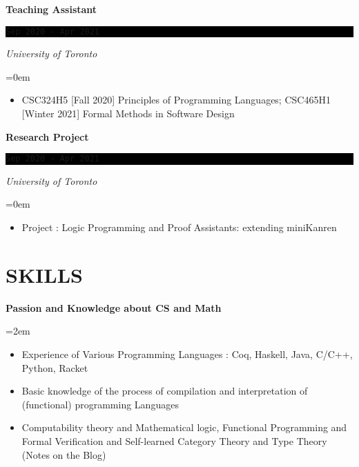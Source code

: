 \documentclass[fontsize=11pt]{article}
\newcommand{\NewPart}[1]{\section*{\uppercase{#1}}}
\newcommand{\SkillEntry}[2]{       %
    \noindent \textbf{#1} \hfill      %
        \noindent \textit{#2} \par        %
}
\newcommand{\SkillsEntry}[4]{       %
    \noindent \textbf{#1} \hfill      %
        \noindent \textit{#2} \par        %
    \noindent\hangindent=2em\hangafter=0 \small #4 %
    \normalsize \par}
\newcommand{\EducationEntry}[4]{
    \noindent \textbf{#1} \hfill      %
    \colorbox{Black}{ 
      \parbox{11em}{
      \centering \color{White}#2}} \par  %
    \noindent \textit{#3} \par        %
    \noindent\hangindent=0em\hangafter=0 \small #4 %
    \normalsize \par}
\newcommand{\WorkEntry}[4]{       %
    \noindent \textbf{#1} \hfill      %
    \colorbox{Black}{%
      \parbox{11em}{%
      \centering\color{White}#2}} \par   %
        \noindent \textit{#3} \par        %
    \noindent\hangindent=0em\hangafter=0 \small #4 %
    \normalsize \par}
\begin{document}
\WorkEntry
{Teaching Assistant}
{\texttt{Sep 2020 - Apr 2021}}
{University of Toronto}
{\begin{itemize} \itemsep -1pt
    \item CSC324H5 [Fall 2020] Principles of Programming Languages; CSC465H1 [Winter 2021] Formal Methods in Software Design
    \end{itemize}}

\WorkEntry
{Research Project}
{\texttt{Sep 2020 - Apr 2021}}
{University of Toronto}
{\begin{itemize} \itemsep -1pt
    \item Project : Logic Programming and Proof Assistants: extending miniKanren
    \end{itemize}}
\NewPart{Skills}{}

\SkillsEntry{Passion and Knowledge about CS and Math}{}{}{
    \begin{itemize} \itemsep -1pt
        \item Experience of Various Programming Languages : Coq, Haskell, Java, C/C++, Python, Racket
        \item Basic knowledge of the process of compilation and interpretation of (functional) programming Languages
        \item 
        Computability theory and Mathematical logic, Functional Programming and Formal Verification
        and Self-learned Category Theory and Type Theory (Notes on the Blog)
    \end{itemize}
}
\end{document}
